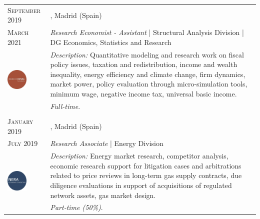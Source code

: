 \begin{longtable}{R{2.5cm}|p{14.8cm}}
 	 	\textsc{September 2019} & \textsc{}, \faMapMarker \hspace{0.5 mm} Madrid (Spain) \\
 	\textsc{March 2021} 	& \textit{Research Economist - Assistant} | Structural Analysis Division | DG Economics, Statistics and Research  \\
	 & 
 	\footnotesize{\faTasks \emph{ Description: }Quantitative modeling and research work on fiscal policy issues, taxation and redistribution, income and wealth inequality, energy efficiency and climate change, firm dynamics, market power, policy evaluation through micro-simulation tools, minimum wage, negative income tax, universal basic income.} \\ &
	\footnotesize{\faFileText \emph{ Full-time}.} \\
 	 \\
	
	 	\textsc{January 2019} & \textsc{}, \faMapMarker \hspace{0.5 mm} Madrid (Spain) \\
 	\textsc{July 2019} 	& \textit{Research Associate} | Energy Division   \\
	 & 
 	\footnotesize{\faTasks \emph{ Description: }Energy market research, competitor analysis, economic research support for litigation cases and arbitrations related to price reviews in long-term gas supply contracts, due diligence evaluations in support of acquisitions of regulated network assets, gas market design.} \\ &
	\footnotesize{\faFileText \emph{ Part-time (50\%)}.} \\
	
\end{longtable}